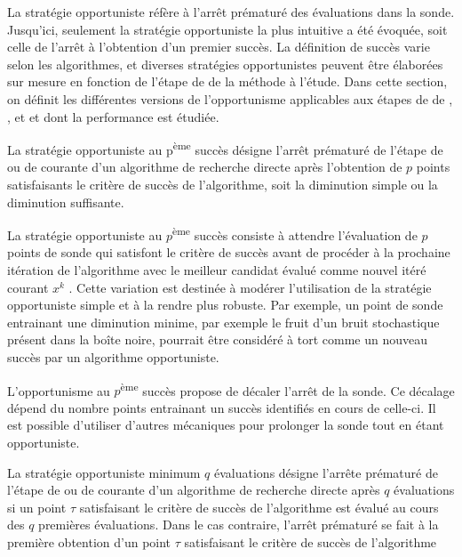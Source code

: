 La stratégie opportuniste réfère à l'arrêt prématuré des évaluations dans la sonde. Jusqu'ici, seulement la stratégie opportuniste la plus intuitive a été évoquée, soit celle de l'arrêt à l'obtention d'un premier succès. La définition de succès varie selon les algorithmes, et diverses stratégies opportunistes peuvent être élaborées sur mesure en fonction de l'étape de \POLL de la méthode à l'étude. Dans cette section, on définit les différentes versions de l'opportunisme applicables aux étapes de \POLL de \CS, \GPS, \GSS et \MADS et dont la performance est étudiée.  
  
\begin{definition}
\label{def:oppemesucces}
La stratégie opportuniste au p\textsuperscript{ème} succès désigne l'arrêt prématuré de l'étape de \SEARCH ou de \POLL courante d'un algorithme de recherche directe après l'obtention de $p$ points satisfaisants le critère de succès de l'algorithme, soit la diminution simple ou la diminution suffisante.
\end{definition}
La stratégie opportuniste au $p$\textsuperscript{ème} succès consiste à attendre l'évaluation de $p$ points de sonde qui satisfont le critère de succès avant de procéder à la prochaine itération de l'algorithme avec le meilleur candidat évalué comme nouvel itéré courant $x^k$ . Cette variation est destinée à modérer l'utilisation de la stratégie opportuniste simple et à la rendre plus robuste. Par exemple, un point de sonde entrainant une diminution minime, par exemple le fruit d'un bruit stochastique présent dans la boîte noire, pourrait être considéré à tort comme un nouveau succès par un algorithme opportuniste.   
  
L'opportunisme au $p$\textsuperscript{ème} succès propose de décaler l'arrêt de la sonde. Ce décalage dépend du nombre points entrainant un succès identifiés en cours de celle-ci. Il est possible d'utiliser d'autres mécaniques pour prolonger la sonde tout en étant opportuniste.

\begin{definition}
	\label{def:opmineval}
	La stratégie opportuniste minimum $q$ évaluations désigne l'arrête prématuré de l'étape de \SEARCH ou de \POLL courante d'un algorithme de recherche directe après $q$ évaluations si un point $\tau$ satisfaisant le critère de succès de l'algorithme est évalué au cours des $q$ premières évaluations. Dans le cas contraire, l'arrêt prématuré se fait à la première obtention d'un point $\tau$ satisfaisant le critère de succès de l'algorithme
\end{definition}

